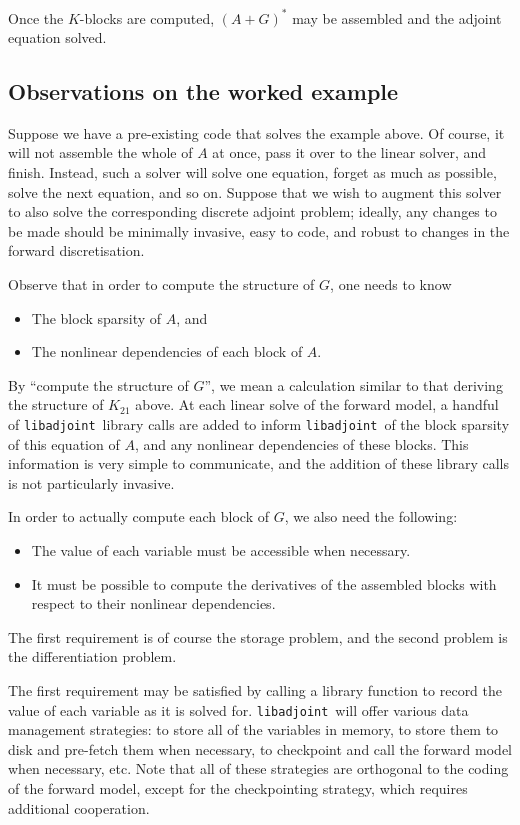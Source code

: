 \documentclass[10pt,authoryear]{elsarticle}
\newcommand{\libadjoint}[0]{{\texttt{libadjoint}}}
\begin{document}
Once the $K$-blocks are computed, $(A + G)^{*}$ may be assembled and the adjoint equation solved.

\subsection{Observations on the worked example}
Suppose we have a pre-existing code that solves the example above. Of course, it will not assemble
the whole of $A$ at once, pass it over to the linear solver, and finish. 
Instead, such a solver will solve one equation, forget as much as possible, solve the next equation,
and so on. Suppose that we wish to augment this solver to also solve the corresponding discrete adjoint problem;
ideally, any changes to be made should be minimally invasive, easy to code, and robust to changes in the forward
discretisation.

Observe that in order to compute the structure of $G$, one needs to know
\begin{itemize}
\item The block sparsity of $A$, and
\item The nonlinear dependencies of each block of $A$.
\end{itemize}
By ``compute the structure of $G$'', we mean a calculation similar to that deriving the structure of $K_{21}$ above.
At each linear solve of the forward model, a handful of \libadjoint\ library calls are added to inform \libadjoint\ 
of the block sparsity of this equation of $A$, and any nonlinear dependencies of these blocks. This information is
very simple to communicate, and the addition of these library calls is not particularly invasive.

In order to actually compute each block of $G$, we also need the following:
\begin{itemize}
\item The value of each variable must be accessible when necessary.
\item It must be possible to compute the derivatives of the assembled blocks with respect to their nonlinear dependencies.
\end{itemize}
The first requirement is of course the storage problem, and the second problem is the differentiation problem.

The first requirement may be satisfied by calling a library function to record the value of each variable
as it is solved for. \libadjoint\ will offer various data management strategies: to store all of the variables
in memory, to store them to disk and pre-fetch them when necessary, to checkpoint and call the forward model when necessary,
etc. Note that all of these strategies are orthogonal to the coding of the forward model, except for the checkpointing
strategy, which requires additional cooperation.
\end{document}
